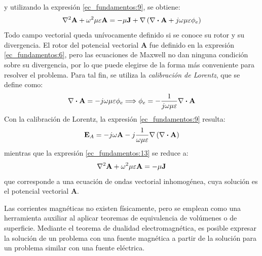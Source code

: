 y utilizando la expresión \eqref{ec_fundamentos:9}, se obtiene:
\begin{align}
\nabla^2\mathbf{A} + \omega^2\mu\varepsilon\mathbf{A} = - \mu\mathbf{J} + \nabla\left(\nabla\boldsymbol{\cdot}\mathbf{A} + j\omega\mu\varepsilon\phi_e\right)
\label{ec_fundamentos:13}
\end{align}
Todo campo vectorial queda unívocamente definido si se conoce su rotor y su divergencia. El rotor del potencial vectorial $\mathbf{A}$ fue definido en la expresión \eqref{ec_fundamentos:6}, pero las ecuaciones de Maxwell no dan ninguna condición sobre su divergencia, por lo que puede elegirse de la forma más conveniente para resolver el problema. Para tal fin, se utiliza la \emph{calibración de Lorentz}, que se define como:
\begin{align}
\nabla\boldsymbol{\cdot}\mathbf{A} = - j\omega\mu\varepsilon\phi_e \Longrightarrow \phi_e = - \frac{1}{j\omega\mu\varepsilon}\nabla\boldsymbol{\cdot}\mathbf{A}
\label{ec_fundamentos:14}
\end{align}
Con la calibración de Lorentz, la expresión \eqref{ec_fundamentos:9} resulta:
\begin{align}
\mathbf{E}_A = - j\omega\mathbf{A} - j\frac{1}{\omega\mu\varepsilon}\nabla\left(\nabla\boldsymbol{\cdot}\mathbf{A}\right)
\label{ec_fundamentos:15}
\end{align}
mientras que la expresión \eqref{ec_fundamentos:13} se reduce a:
\begin{align}
\nabla^2\mathbf{A} + \omega^2\mu\varepsilon\mathbf{A} = - \mu\mathbf{J}
\label{ec_fundamentos:16}
\end{align}
que corresponde a una ecuación de ondas vectorial inhomogénea, cuya solución es el potencial vectorial $\mathbf{A}$.

Las corrientes magnéticas no existen físicamente, pero se emplean como una herramienta auxiliar al aplicar teoremas de equivalencia de volúmenes o de superficie. Mediante el teorema de dualidad electromagnética, es posible expresar la solución de un problema con una fuente magnética a partir de la solución para un problema similar con una fuente eléctrica.


